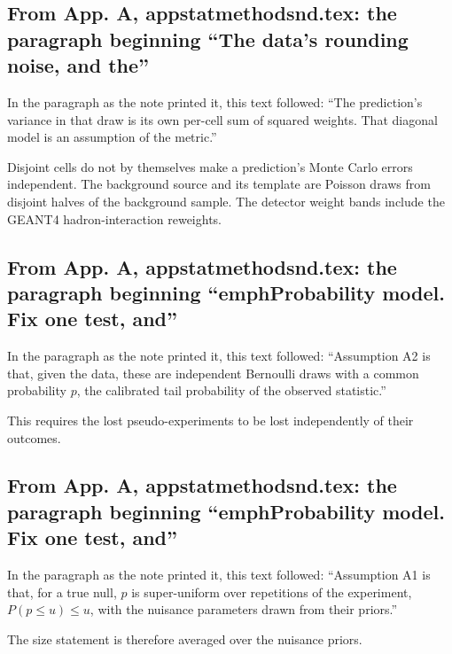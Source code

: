 \subsection{From App. A, appstatmethodsnd.tex: the paragraph beginning ``The data's rounding noise, and the''}
In the paragraph as the note printed it, this text followed: ``The prediction's variance in that draw is its own per-cell sum of squared weights. That diagonal model is an assumption of the metric.''\par
Disjoint cells do not by themselves make a prediction's Monte Carlo errors independent. The background source and its template are Poisson draws from disjoint halves of the background sample. The detector weight bands include the GEANT4 hadron-interaction reweights.

\subsection{From App. A, appstatmethodsnd.tex: the paragraph beginning ``emphProbability model. Fix one test, and''}
In the paragraph as the note printed it, this text followed: ``Assumption A2 is that, given the data, these are independent Bernoulli draws with a common probability $p$, the calibrated tail probability of the observed statistic.''\par
This requires the lost pseudo-experiments to be lost independently of their outcomes.

\subsection{From App. A, appstatmethodsnd.tex: the paragraph beginning ``emphProbability model. Fix one test, and''}
In the paragraph as the note printed it, this text followed: ``Assumption A1 is that, for a true null, $p$ is super-uniform over repetitions of the experiment, $P(p\le u)\le u$, with the nuisance parameters drawn from their priors.''\par
The size statement is therefore averaged over the nuisance priors.

